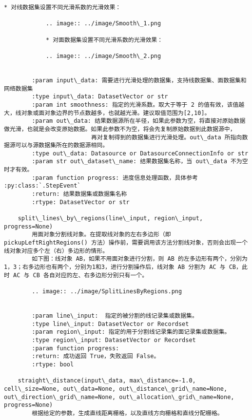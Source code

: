 \documentclass[11pt]{article}
\begin{document}
\begin{Verbatim}[commandchars=\\\{\}]
            * 对线数据集设置不同光滑系数的光滑效果：
        
            .. image:: ../image/Smooth\_1.png
        
            * 对面数据集设置不同光滑系数的光滑效果：
        
            .. image:: ../image/Smooth\_2.png
        
        
        :param input\_data: 需要进行光滑处理的数据集，支持线数据集、面数据集和网络数据集
        :type input\_data: DatasetVector or str
        :param int smoothness: 指定的光滑系数。取大于等于 2 的值有效，该值越大，线对象或面对象边界的节点数越多，也就越光滑。建议取值范围为[2,10]。
        :param out\_data: 结果数据源所在半径，如果此参数为空，将直接对原始数据做光滑，也就是会改变原始数据。如果此参数不为空，将会先复制原始数据到此数据源中，
                         再对复制得到的数据集进行光滑处理。out\_data 所指向数据源可以与源数据集所在的数据源相同。
        :type out\_data: Datasource or DatasourceConnectionInfo or str
        :param str out\_dataset\_name: 结果数据集名称，当 out\_data 不为空时才有效。
        :param function progress: 进度信息处理函数，具体参考 :py:class:`.StepEvent`
        :return: 结果数据集或数据集名称
        :rtype: DatasetVector or str
    
    split\_lines\_by\_regions(line\_input, region\_input, progress=None)
        用面对象分割线对象。在提取线对象的左右多边形（即 pickupLeftRightRegions() 方法）操作前，需要调用该方法分割线对象，否则会出现一个线对象对应多个左（右）多边形的情形。
        如下图：线对象 AB，如果不用面对象进行分割，则 AB 的左多边形有两个，分别为1，3；右多边形也有两个，分别为1和3，进行分割操作后，线对象 AB 分割为 AC 与 CB，此时 AC 与 CB 各自对应的左、右多边形分别只有一个。
        
        .. image:: ../image/SplitLinesByRegions.png
        
        
        :param line\_input:  指定的被分割的线记录集或数据集。
        :type line\_input: DatasetVector or Recordset
        :param region\_input: 指定的用于分割线记录集的面记录集或数据集。
        :type region\_input: DatasetVector or Recordset
        :param function progress:
        :return: 成功返回 True，失败返回 False。
        :rtype: bool
    
    straight\_distance(input\_data, max\_distance=-1.0, cell\_size=None, out\_data=None, out\_distance\_grid\_name=None, out\_direction\_grid\_name=None, out\_allocation\_grid\_name=None, progress=None)
        根据给定的参数，生成直线距离栅格，以及直线方向栅格和直线分配栅格。
        

\end{Verbatim}
\end{document}
